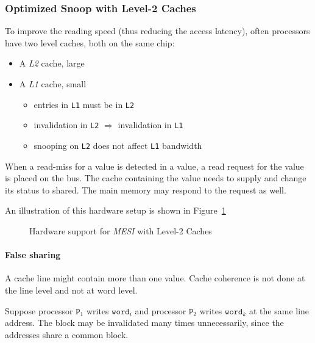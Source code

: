 \documentclass[english]{article}
\begin{document}
\subsubsection{Optimized Snoop with Level-2 Caches}

To improve the reading speed (thus reducing the access latency), often processors have two level caches, both on the same chip:

\begin{itemize}
  \item A \textit{L2} cache, large
  \item A \textit{L1} cache, small
        \begin{itemize}
          \item entries in \texttt{L1} must be in \texttt{L2}
          \item invalidation in \texttt{L2} \(\Rightarrow\) invalidation in \texttt{L1}
          \item snooping on \texttt{L2} does not affect \texttt{L1} bandwidth
        \end{itemize}
\end{itemize}

When a read-miss for a value is detected in a value, a read request for the value is placed on the bus.
The cache containing the value needs to supply and change its status to shared.
The main memory may respond to the request as well.

\bigskip
An illustration of this hardware setup is shown in Figure~\ref{fig:MESI-bus-rd-level-2}

\begin{figure}[htbp]
  \centering
  \bigskip
  \caption{Hardware support for \textit{MESI} with Level-2 Caches}
  \label{fig:MESI-bus-rd-level-2}
  \bigskip
\end{figure}

\paragraph{False sharing}

A cache line might contain more than one value.
Cache coherence is not done at the line level and not at word level.

Suppose processor \(\texttt{P}_1\) writes \(\texttt{word}_i\) and processor \(\texttt{P}_2\) writes \(\texttt{word}_k\) at the same line address.
The block may be invalidated many times unnecessarily, since the addresses share a common block.
\end{document}
